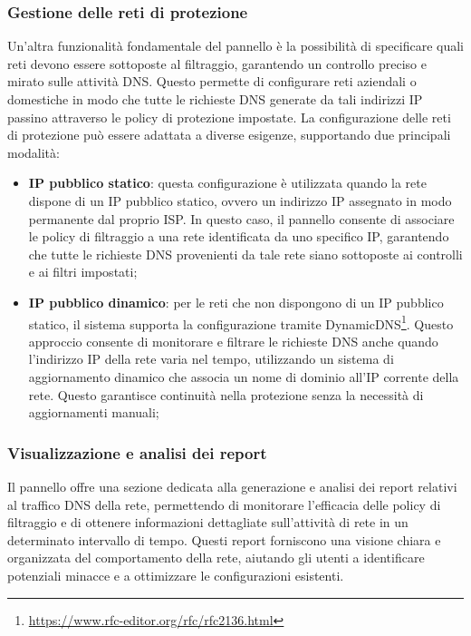 \subsubsection{Gestione delle reti di protezione}
Un'altra funzionalità fondamentale del pannello è la possibilità di specificare quali reti devono essere sottoposte al filtraggio, garantendo un controllo preciso e mirato sulle attività DNS. Questo permette di configurare reti aziendali o domestiche in modo che tutte le richieste DNS generate da tali indirizzi IP passino attraverso le policy di protezione impostate. La configurazione delle reti di protezione può essere adattata a diverse esigenze, supportando due principali modalità:
\begin{itemize}
  \item \textbf{IP pubblico statico}: questa configurazione è utilizzata quando la rete dispone di un IP pubblico statico, ovvero un indirizzo IP assegnato in modo permanente dal proprio ISP. In questo caso, il pannello consente di associare le policy di filtraggio a una rete identificata da uno specifico IP, garantendo che tutte le richieste DNS provenienti da tale rete siano sottoposte ai controlli e ai filtri impostati;

  \item \textbf{IP pubblico dinamico}: per le reti che non dispongono di un IP pubblico statico, il sistema supporta la configurazione tramite DynamicDNS\footnote{\url{https://www.rfc-editor.org/rfc/rfc2136.html}}. Questo approccio consente di monitorare e filtrare le richieste DNS anche quando l’indirizzo IP della rete varia nel tempo, utilizzando un sistema di aggiornamento dinamico che associa un nome di dominio all’IP corrente della rete. Questo garantisce continuità nella protezione senza la necessità di aggiornamenti manuali;
\end{itemize}

\subsubsection{Visualizzazione e analisi dei report}
Il pannello offre una sezione dedicata alla generazione e analisi dei report relativi al traffico DNS della rete, permettendo di monitorare l’efficacia delle policy di filtraggio e di ottenere informazioni dettagliate sull’attività di rete in un determinato intervallo di tempo. Questi report forniscono una visione chiara e organizzata del comportamento della rete, aiutando gli utenti a identificare potenziali minacce e a ottimizzare le configurazioni esistenti.

